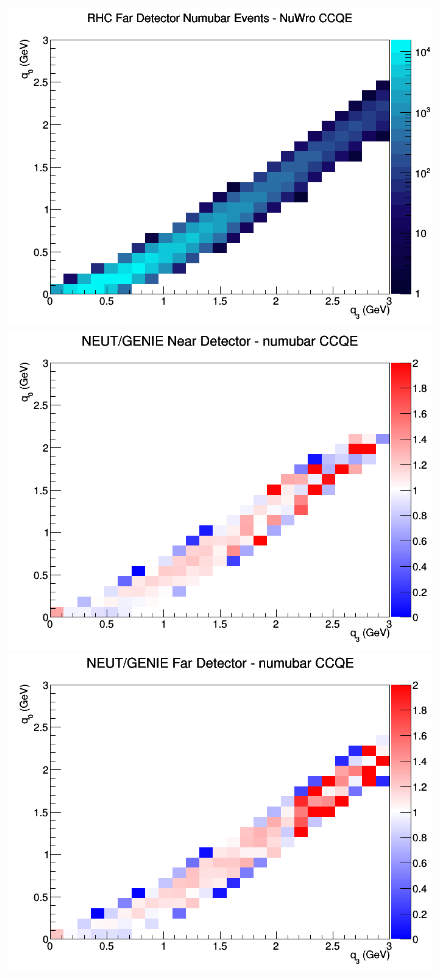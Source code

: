 \begin{figure}[h]
\endminipage
{}
\includegraphics[width=\linewidth]{q0_q3/nominal/CCQE_RHC_FD_numubar_q3_q0_NuWro.png}
\endminipage
\newline
{}
\includegraphics[width=\linewidth]{q0_q3/nominal/ratios/CCQE_NEUT_GENIE_numubar_near_q3_q0.png}
\endminipage
{}
\includegraphics[width=\linewidth]{q0_q3/nominal/ratios/CCQE_NEUT_GENIE_numubar_far_q3_q0.png}

\end{figure}
